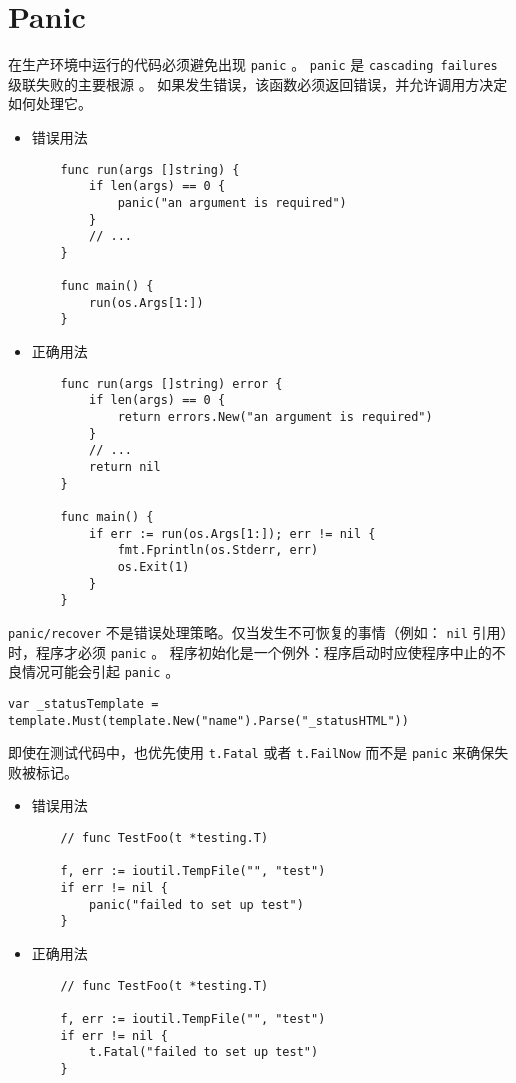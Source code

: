\chapter{Panic}
在生产环境中运行的代码必须避免出现 \texttt{panic} 。 \texttt{panic} 是 \texttt{cascading failures} 级联失败的主要根源 。
如果发生错误，该函数必须返回错误，并允许调用方决定如何处理它。
\begin{itemize}[leftmargin=4em]
\item 错误用法

  \begin{verbatim}
    func run(args []string) {
    	if len(args) == 0 {
    		panic("an argument is required")
    	}
    	// ...
    }

    func main() {
    	run(os.Args[1:])
    }
  \end{verbatim}
\item 正确用法

  \begin{verbatim}
    func run(args []string) error {
    	if len(args) == 0 {
    		return errors.New("an argument is required")
    	}
    	// ...
    	return nil
    }

    func main() {
    	if err := run(os.Args[1:]); err != nil {
    		fmt.Fprintln(os.Stderr, err)
    		os.Exit(1)
    	}
    }
  \end{verbatim}
\end{itemize}

\texttt{panic/recover} 不是错误处理策略。仅当发生不可恢复的事情（例如： \texttt{nil} 引用）时，程序才必须 \texttt{panic} 。
程序初始化是一个例外：程序启动时应使程序中止的不良情况可能会引起 \texttt{panic} 。
\begin{verbatim}
var _statusTemplate = template.Must(template.New("name").Parse("_statusHTML"))
\end{verbatim}

即使在测试代码中，也优先使用 \texttt{t.Fatal} 或者 \texttt{t.FailNow} 而不是 \texttt{panic} 来确保失败被标记。
\begin{itemize}[leftmargin=4em]
\item 错误用法

  \begin{verbatim}
    // func TestFoo(t *testing.T)

    f, err := ioutil.TempFile("", "test")
    if err != nil {
    	panic("failed to set up test")
    }
  \end{verbatim}
\item 正确用法

  \begin{verbatim}
    // func TestFoo(t *testing.T)

    f, err := ioutil.TempFile("", "test")
    if err != nil {
    	t.Fatal("failed to set up test")
    }
  \end{verbatim}
\end{itemize}

